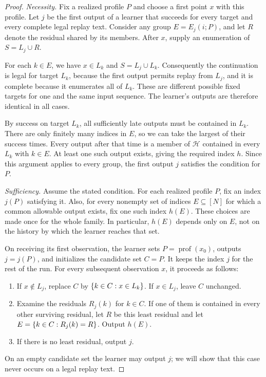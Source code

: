 \begin{proof}
\emph{Necessity.}
Fix a realized profile $P$ and choose a first point $x$ with this profile.
Let $j$ be the first output of a learner that succeeds for every target
and every complete legal replay text. Consider any group
$E=E_j(i;P)$, and let $R$ denote the residual shared by its members.
After $x$, supply an enumeration of $S=L_j\cup R$.

For each $k\in E$, we have $x\in L_k$ and
$S=L_j\cup L_k$. Consequently the continuation is legal for target
$L_k$, because the first output permits replay from $L_j$, and it is
complete because it enumerates all of $L_k$. These are different
possible fixed targets for one and the same input sequence. The
learner's outputs are therefore identical in all cases.

By success on target $L_k$, all sufficiently late outputs must be
contained in $L_k$. There are only finitely many indices in $E$, so
we can take the largest of their success times. Every output after
that time is a member of $\mathcal H$ contained in every $L_k$ with
$k\in E$. At least one such output exists, giving the required index
$h$. Since this argument applies to every group, the first output
$j$ satisfies the condition for $P$.

\emph{Sufficiency.}
Assume the stated condition. For each realized profile $P$, fix an
index $j(P)$ satisfying it. Also, for every nonempty set of indices
$E\subseteq[N]$ for which a common allowable output exists, fix one
such index $h(E)$. These choices are made once for the whole family.
In particular, $h(E)$ depends only on $E$, not on the history by which
the learner reaches that set.

On receiving its first observation, the learner sets
$P=\operatorname{prof}(x_0)$, outputs $j=j(P)$, and initializes the
candidate set $C=P$. It keeps the index $j$ for the rest of the run.
For every subsequent observation $x$, it proceeds as follows:
\begin{enumerate}
\item If $x\notin L_j$, replace $C$ by
      $\{k\in C:x\in L_k\}$. If $x\in L_j$, leave $C$
      unchanged.
\item Examine the residuals $R_j(k)$ for $k\in C$. If one of them
      is contained in every other surviving residual, let $R$ be
      this least residual and let
      $E=\{k\in C:R_j(k)=R\}$. Output $h(E)$.
\item If there is no least residual, output $j$.
\end{enumerate}
On an empty candidate set the learner may output $j$; we will show
that this case never occurs on a legal replay text.


\end{proof}
